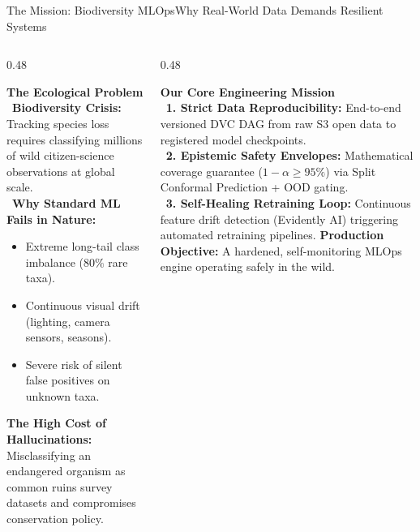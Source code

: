 \documentclass[aspectratio=169,10pt]{beamer}
\begin{document}
\begin{frame}{The Mission: Biodiversity MLOps}{Why Real-World Data Demands Resilient Systems}
    \begin{columns}[T]
        \begin{column}{0.48\textwidth}
            \begin{card}
                \textbf{\color{BlueAccent} The Ecological Problem}\\[3pt]
                \textbullet\ \textbf{Biodiversity Crisis:} Tracking species loss requires classifying millions of wild citizen-science observations at global scale.\\[3pt]
                \textbullet\ \textbf{Why Standard ML Fails in Nature:}
                \begin{itemize}\scriptsize
                    \item Extreme long-tail class imbalance ($80\%$ rare taxa).
                    \item Continuous visual drift (lighting, camera sensors, seasons).
                    \item Severe risk of silent false positives on unknown taxa.
                \end{itemize}
                \vspace{0.25cm}
                \textbf{\color{RoseAccent} The High Cost of Hallucinations:}\\[2pt]
                Misclassifying an endangered organism as common ruins survey datasets and compromises conservation policy.
            \end{card}
        \end{column}
        \begin{column}{0.48\textwidth}
            \begin{greencard}
                \textbf{\color{GreenAccent} Our Core Engineering Mission}\\[3pt]
                \textbullet\ \textbf{1. Strict Data Reproducibility:} End-to-end versioned DVC DAG from raw S3 open data to registered model checkpoints.\\[3pt]
                \textbullet\ \textbf{2. Epistemic Safety Envelopes:} Mathematical coverage guarantee ($1-\alpha \ge 95\%$) via Split Conformal Prediction + OOD gating.\\[3pt]
                \textbullet\ \textbf{3. Self-Healing Retraining Loop:} Continuous feature drift detection (Evidently AI) triggering automated retraining pipelines.
                \vspace{0.25cm}
                \tcblower
                \centering\textbf{\color{SlateMid} Production Objective:} A hardened, self-monitoring MLOps engine operating safely in the wild.
            \end{greencard}
        \end{column}
    \end{columns}
\end{frame}
\end{document}
